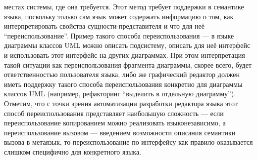 местах системы, где она требуется. Этот метод требует поддержки в семантике 
языка, поскольку только сам язык может содержать информацию о том, как 
интерпретировать свойства сущности-представителя и что для неё 
"`переиспользование"'. Пример такого способа переиспользования --- в языке 
диаграммы классов UML можно описать подсистему, описать для неё интерфейс и 
использовать этот интерфейс на других диаграммах. При этом интерпретация такой 
ситуации как переиспользования фрагмента диаграммы, скорее всего, будет 
ответственностью пользователя языка, либо же графический редактор должен иметь 
поддержку такого способа переиспользования конкретно для диаграммы классов UML 
(например, рефакторинг "`выделить в отдельную диаграмму"'). Отметим, что с 
точки зрения автоматизации разработки редактора языка этот способ 
переиспользования представляет наибольшую сложность --- если переиспользование 
копированием можно реализовать языконезависимо, а переиспользование вызовом --- 
введением возможности описания семантики вызова в метаязык, то 
переиспользование по интерфейсу как правило оказывается слишком специфично для 
конкретного языка.

